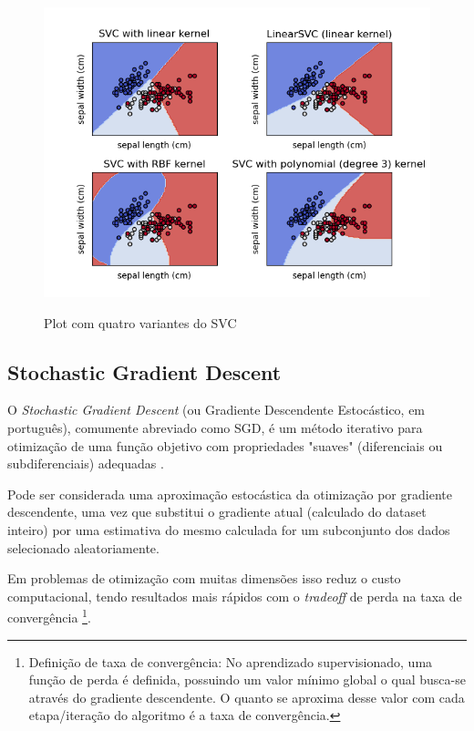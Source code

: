 \begin{figure}[ht]
    \centering
    \caption{Plot com quatro variantes do SVC}
    \includegraphics[width=14cm]{figuras/plot-svc.png} 
    \label{fig:internet} 
\end{figure}

\subsection{Stochastic Gradient Descent}

O \textit{Stochastic Gradient Descent} (ou Gradiente Descendente Estocástico, em português), comumente abreviado como SGD, é um método iterativo para otimização de uma função objetivo com propriedades "suaves" (diferenciais ou subdiferenciais) adequadas \cite{ruder2016overview}.

Pode ser considerada uma aproximação estocástica da otimização por gradiente descendente, uma vez que substitui o gradiente atual (calculado do dataset inteiro) por uma estimativa do mesmo calculada for um subconjunto dos dados selecionado aleatoriamente.

Em problemas de otimização com muitas dimensões isso reduz o custo computacional, tendo resultados mais rápidos com o \textit{tradeoff} de perda na taxa de convergência \footnote{Definição de taxa de convergência: No aprendizado supervisionado, uma função de perda é definida, possuindo um valor mínimo global o qual busca-se através do gradiente descendente. O quanto se aproxima desse valor com cada etapa/iteração do algoritmo é a taxa de convergência.}.

